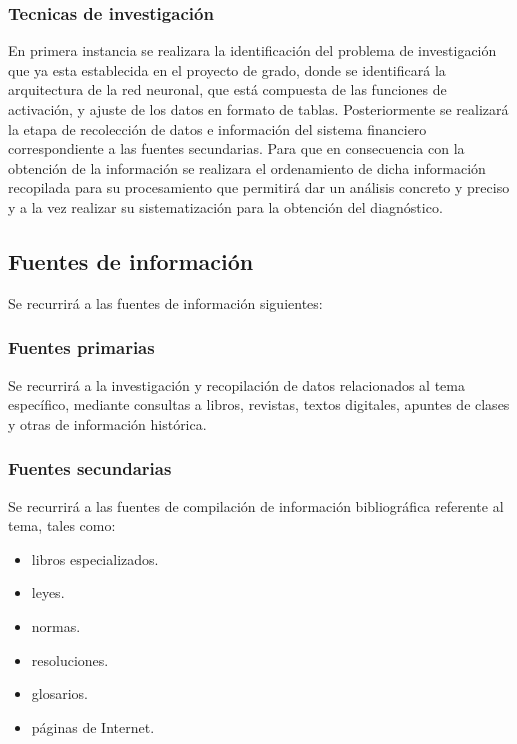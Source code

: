 \documentclass[
  12pt,
]{article}
\providecommand{\tightlist}{%
  \setlength{\itemsep}{0pt}\setlength{\parskip}{0pt}}
\begin{document}
\hypertarget{tecnicas-de-investigaciuxf3n}{%
\subsubsection{Tecnicas de
investigación}\label{tecnicas-de-investigaciuxf3n}}

En primera instancia se realizara la identificación del problema de
investigación que ya esta establecida en el proyecto de grado, donde se
identificará la arquitectura de la red neuronal, que está compuesta de
las funciones de activación, y ajuste de los datos en formato de tablas.
Posteriormente se realizará la etapa de recolección de datos e
información del sistema financiero correspondiente a las fuentes
secundarias. Para que en consecuencia con la obtención de la información
se realizara el ordenamiento de dicha información recopilada para su
procesamiento que permitirá dar un análisis concreto y preciso y a la
vez realizar su sistematización para la obtención del diagnóstico.

\newpage


\hypertarget{fuentes-de-informaciuxf3n}{%
\subsection{Fuentes de información}\label{fuentes-de-informaciuxf3n}}

Se recurrirá a las fuentes de información siguientes:

\hypertarget{fuentes-primarias}{%
\subsubsection{Fuentes primarias}\label{fuentes-primarias}}

Se recurrirá a la investigación y recopilación de datos relacionados al
tema específico, mediante consultas a libros, revistas, textos
digitales, apuntes de clases y otras de información histórica.

\hypertarget{fuentes-secundarias}{%
\subsubsection{Fuentes secundarias}\label{fuentes-secundarias}}

Se recurrirá a las fuentes de compilación de información bibliográfica
referente al tema, tales como:

\begin{itemize}
\tightlist
\item
  libros especializados.
\item
  leyes.
\item
  normas.
\item
  resoluciones.
\item
  glosarios.
\item
  páginas de Internet.
\end{itemize}
\end{document}
